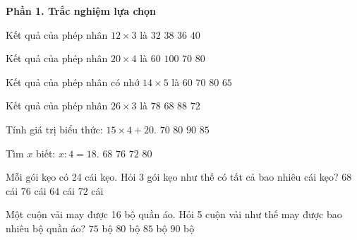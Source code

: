 \textbf{Phần 1. Trắc nghiệm lựa chọn}

\begin{ex} %
Kết quả của phép nhân $12 \times 3$ là
\choice
{$32$}
{$38$}
{\True $36$}
{$40$}
\end{ex}

\begin{ex} %
Kết quả của phép nhân $20 \times 4$ là
\choice
{$60$}
{$100$}
{$70$}
{\True $80$}
\end{ex}

\begin{ex} %
Kết quả của phép nhân có nhớ $14 \times 5$ là
\choice
{$60$}
{\True $70$}
{$80$}
{$65$}
\end{ex}

\begin{ex} %
Kết quả của phép nhân $26 \times 3$ là
\choice
{\True $78$}
{$68$}
{$88$}
{$72$}
\end{ex}

\begin{ex} %
Tính giá trị biểu thức: $15 \times 4 + 20$.
\choice
{$70$}
{\True $80$}
{$90$}
{$85$}
\end{ex}

\begin{ex} %
Tìm $x$ biết: $x : 4 = 18$.
\choice
{$68$}
{$76$}
{\True $72$}
{$80$}
\end{ex}

\begin{ex} %
Mỗi gói kẹo có 24 cái kẹo. Hỏi 3 gói kẹo như thế có tất cả bao nhiêu cái kẹo?
\choice
{$68$ cái}
{$76$ cái}
{$64$ cái}
{\True $72$ cái}
\end{ex}

\begin{ex} %
Một cuộn vải may được 16 bộ quần áo. Hỏi 5 cuộn vải như thế may được bao nhiêu bộ quần áo?
\choice
{$75$ bộ}
{\True $80$ bộ}
{$85$ bộ}
{$90$ bộ}
\end{ex}


